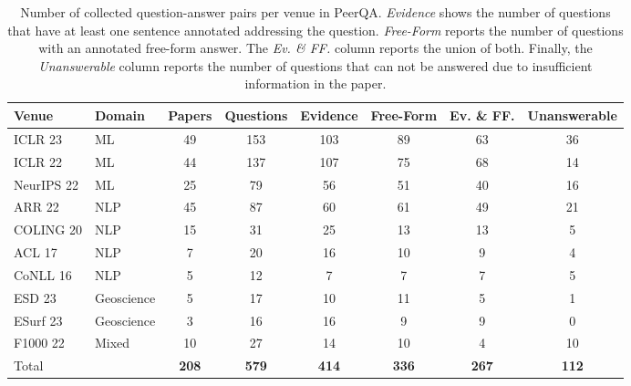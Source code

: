 \begin{table*}[!ht]
\small
\centering
\begin{tabular}{@{}llcccccc@{}}
\toprule
Venue & Domain & Papers & Questions & Evidence & Free-Form & Ev. \& FF. & Unanswerable \\ \midrule
ICLR 23 & ML & 49 & 153 & 103 & 89 & 63 & 36 \\
ICLR 22 & ML & 44 & 137 & 107 & 75 & 68 & 14 \\
NeurIPS 22 & ML & 25 & 79 & 56 & 51 & 40 & 16 \\ 
ARR 22 & NLP & 45 & 87 & 60 & 61 & 49 & 21 \\
COLING 20 & NLP & 15 & 31 & 25 & 13 & 13 & 5 \\
ACL 17 & NLP & 7 & 20 & 16 & 10 & 9 & 4 \\
CoNLL 16 & NLP & 5 & 12 & 7 & 7 & 7 & 5 \\
ESD 23 & Geoscience & 5 & 17 & 10 & 11 & 5 & 1 \\
ESurf 23 & Geoscience & 3 & 16 & 16 & 9 & 9 & 0 \\
F1000 22 & Mixed & 10 & 27 & 14 & 10 & 4 & 10 \\
\midrule
Total &  & \textbf{208} & \textbf{579} & \textbf{414} & \textbf{336} & \textbf{267} & \textbf{112} \\ \bottomrule
\end{tabular}
\caption{Number of collected question-answer pairs per venue in PeerQA. \textit{Evidence} shows the number of questions that have at least one sentence annotated addressing the question. \textit{Free-Form} reports the number of questions with an annotated free-form answer. The \textit{Ev. \& FF.} column reports the union of both. Finally, the \textit{Unanswerable} column reports the number of questions that can not be answered due to insufficient information in the paper.}\label{tbl:dataset-nums}
\end{table*}